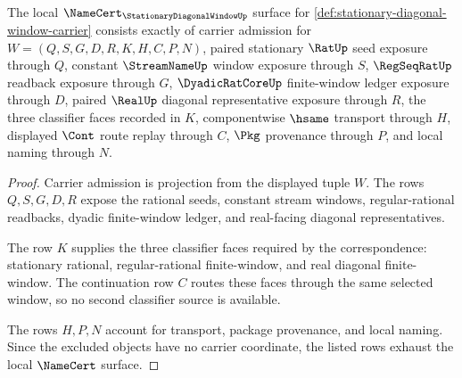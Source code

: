 \begin{theorem}
\label{thm:stationary-diagonal-window-namecert-obligations}
The local $\NameCert_{\StationaryDiagonalWindowUp}$ surface for \autoref{def:stationary-diagonal-window-carrier} consists exactly of carrier admission for $W=(Q,S,G,D,R,K,H,C,P,N)$, paired stationary $\RatUp$ seed exposure through $Q$, constant $\StreamNameUp$ window exposure through $S$, $\RegSeqRatUp$ readback exposure through $G$, $\DyadicRatCoreUp$ finite-window ledger exposure through $D$, paired $\RealUp$ diagonal representative exposure through $R$, the three classifier faces recorded in $K$, componentwise $\hsame$ transport through $H$, displayed $\Cont$ route replay through $C$, $\Pkg$ provenance through $P$, and local naming through $N$.
\end{theorem}
\begin{proof}
Carrier admission is projection from the displayed tuple $W$. The rows $Q,S,G,D,R$ expose the rational seeds, constant stream windows, regular-rational readbacks, dyadic finite-window ledger, and real-facing diagonal representatives.

The row $K$ supplies the three classifier faces required by the correspondence: stationary rational, regular-rational finite-window, and real diagonal finite-window. The continuation row $C$ routes these faces through the same selected window, so no second classifier source is available.

The rows $H,P,N$ account for transport, package provenance, and local naming. Since the excluded objects have no carrier coordinate, the listed rows exhaust the local $\NameCert$ surface.
\end{proof}

